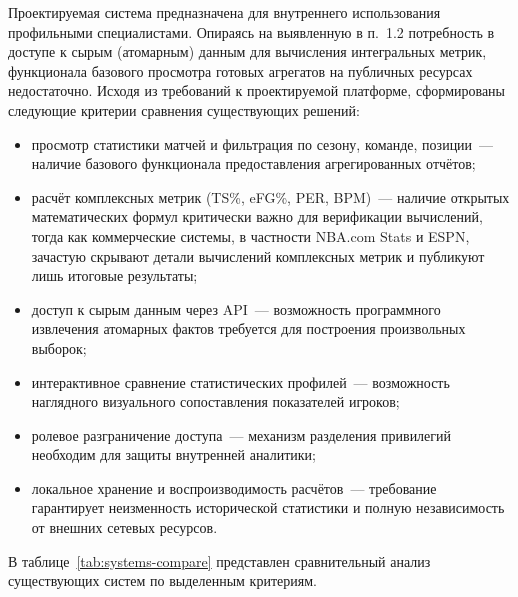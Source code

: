 Проектируемая система предназначена для внутреннего использования
профильными специалистами. Опираясь на выявленную в п.~1.2 потребность
в доступе к сырым (атомарным) данным для вычисления интегральных метрик,
функционала базового просмотра готовых агрегатов на публичных ресурсах
недостаточно. Исходя из требований к проектируемой платформе, сформированы
следующие критерии сравнения существующих решений:
\begin{itemize}
    \item просмотр статистики матчей и фильтрация по сезону, команде, позиции~---
          наличие базового функционала предоставления агрегированных отчётов;
    \item расчёт комплексных метрик (TS\%, eFG\%, PER, BPM)~--- наличие открытых
          математических формул критически важно для верификации вычислений,
          тогда как коммерческие системы, в частности NBA.com Stats и ESPN,
          зачастую скрывают детали вычислений комплексных метрик
          и публикуют лишь итоговые результаты;
    \item доступ к сырым данным через API~--- возможность программного
          извлечения атомарных фактов требуется для построения произвольных
          выборок;
    \item интерактивное сравнение статистических профилей~--- возможность
          наглядного визуального сопоставления показателей игроков;
    \item ролевое разграничение доступа~--- механизм разделения привилегий
          необходим для защиты внутренней аналитики;
    \item локальное хранение и воспроизводимость расчётов~--- требование
          гарантирует неизменность исторической статистики и полную
          независимость от внешних сетевых ресурсов.
\end{itemize}
В таблице~\ref{tab:systems-compare} представлен сравнительный анализ
существующих систем по выделенным критериям.

